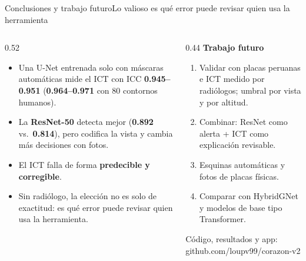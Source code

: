 \documentclass[aspectratio=169,10pt]{beamer}
\newcommand{\nota}[1]{{\color{tinta2}\footnotesize #1}}
\newcommand{\M}[1]{{\color{medir}\bfseries #1}}
\newcommand{\C}[1]{{\color{clasif}\bfseries #1}}
\begin{document}
\begin{frame}{Conclusiones y trabajo futuro}{Lo valioso es qué error puede revisar quien usa la herramienta}
\begin{columns}[T]
\begin{column}{0.52\textwidth}
\begin{itemize}
\item Una U-Net entrenada solo con máscaras automáticas mide el ICT con ICC \M{0.945--0.951} (\M{0.964--0.971} con
  80 contornos humanos).
\item La \C{ResNet-50} detecta mejor (\C{0.892} vs.\ \M{0.814}), pero codifica la vista y cambia más decisiones con
  fotos.
\item El ICT falla de forma \textbf{predecible y corregible}.
\item Sin radiólogo, la elección no es solo de exactitud: es qué error puede revisar quien usa la herramienta.
\end{itemize}
\end{column}
\begin{column}{0.44\textwidth}
\textbf{Trabajo futuro}
\begin{enumerate}\small
\item Validar con placas peruanas e ICT medido por radiólogos; umbral por vista y por altitud.
\item Combinar: ResNet como alerta + ICT como explicación revisable.
\item Esquinas automáticas y fotos de placas físicas.
\item Comparar con HybridGNet y modelos de base tipo Transformer.
\end{enumerate}
\vspace{0.5em}
\nota{Código, resultados y app: github.com/loupv99/corazon-v2}
\end{column}
\end{columns}
\end{frame}
\end{document}
